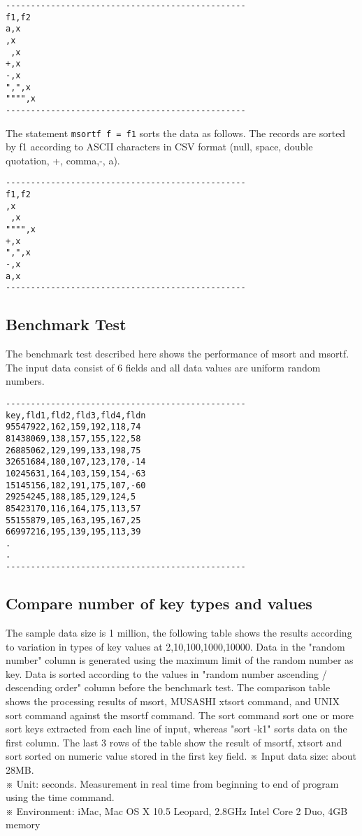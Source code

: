 \documentclass[a4paper]{jarticle}
\begin{document}
\begin{verbatim}
------------------------------------------------
f1,f2
a,x
,x
 ,x
+,x
-,x
",",x
"""",x
------------------------------------------------
\end{verbatim}

The statement \verb|msortf f = f1| sorts the data as follows.  The records are sorted by f1 according to ASCII characters in CSV format (null, space, double quotation, +, comma,-, a). 

\begin{verbatim}
------------------------------------------------
f1,f2
,x
 ,x
"""",x
+,x
",",x
-,x
a,x
------------------------------------------------
\end{verbatim}

\subsection*{Benchmark Test}
The benchmark test described here shows the performance of msort and msortf. 
The input data consist of 6 fields and all data values are uniform random numbers. \\

\begin{verbatim}
------------------------------------------------
key,fld1,fld2,fld3,fld4,fldn
95547922,162,159,192,118,74
81438069,138,157,155,122,58
26885062,129,199,133,198,75
32651684,180,107,123,170,-14
10245631,164,103,159,154,-63
15145156,182,191,175,107,-60
29254245,188,185,129,124,5
85423170,116,164,175,113,57
55155879,105,163,195,167,25
66997216,195,139,195,113,39
.
.
------------------------------------------------
\end{verbatim}

\subsection*{Compare number of key types and values}
The sample data size is 1 million, the following table shows the results according to variation in types of key values at 2,10,100,1000,10000.
Data in the "random number" column is generated using the maximum limit of the random number as key. 
Data is sorted according to the values in "random number ascending / descending order" column before the benchmark test. 
The comparison table shows the processing results of msort, MUSASHI xtsort command, and UNIX sort command against the msortf command.
The sort command sort one or more sort keys extracted from each line of input, whereas "sort -k1" sorts data on the first column. 
The last 3 rows of the table show the result of  msortf, xtsort and sort sorted on numeric value stored in the first key field.
※ Input data size: about 28MB.\\
※ Unit: seconds. Measurement in real time from beginning to end of program using the time command. \\
※ Environment: iMac, Mac OS X 10.5 Leopard, 2.8GHz Intel Core 2 Duo, 4GB memory \\
\end{document}
